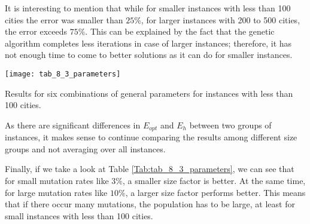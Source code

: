 It is interesting to mention that while for smaller instances with less than 100 cities the error was smaller than $25\%$, for larger instances with 200 to 500 cities, the error exceeds $75\%$. This can be explained by the fact that the genetic algorithm completes less iterations in case of larger instances; therefore, it has not enough time to come to better solutions as it can do for smaller instances.\par 

\begin{table}[htp] \centering
	\centering
	\texttt{[image: tab\_8\_3\_parameters]}
	\caption{Results for six combinations of general parameters for instances with less than 100 cities.}
	\label{Tab:tab_8_3_parameters}
\end{table}

As there are significant differences in $E_{opt}$ and $E_{h}$ between two groups of instances, it makes sense to continue comparing the results among different size groups and not averaging over all instances.\par 

Finally, if we take a look at Table \ref{Tab:tab_8_3_parameters}, we can see that for small mutation rates like $3\%$, a smaller size factor is better. At the same time, for large mutation rates like $10\%$, a larger size factor performs better. This means that if there occur many mutations, the population has to be large, at least for small instances with less than 100 cities.\par 